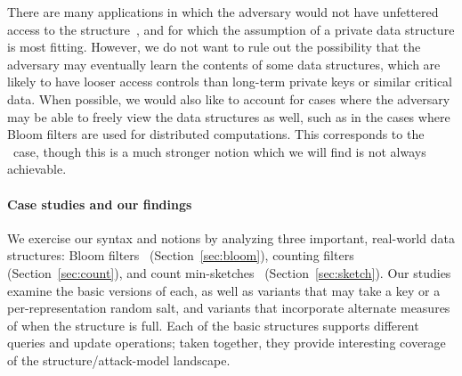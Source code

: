 There are many applications in which the adversary would not have unfettered
access to the structure~\cite{gerbet2015power}, and for which the assumption of
a private data structure is most fitting. However, we do not want to rule out
the possibility that the adversary may eventually learn the contents of some
data structures, which are likely to have looser access controls than long-term
private keys or similar critical data. When possible, we would also like to
account for cases where the adversary may be able to freely view the data
structures as well, such as in the cases where Bloom filters are used for
distributed computations. This corresponds to the \errep\ case, though this is a
much stronger notion which we will find is not always achievable.


\paragraph{Case studies and our findings}
We exercise our syntax and notions by analyzing three important, real-world data
structures: Bloom filters~\cite{bloom1970space} (Section~\ref{sec:bloom}), counting
filters~\cite{fan2000summary} (Section~\ref{sec:count}), and count
min-sketches~\cite{cormode2005improved} (Section~\ref{sec:sketch}). Our studies examine the basic
versions of each, as well as variants that may take a key or a
per-representation random salt, and variants that incorporate alternate measures of
when the structure is full.  Each of the basic structures supports different queries and
update operations; taken together, they provide interesting coverage
of the structure/attack-model landscape.

